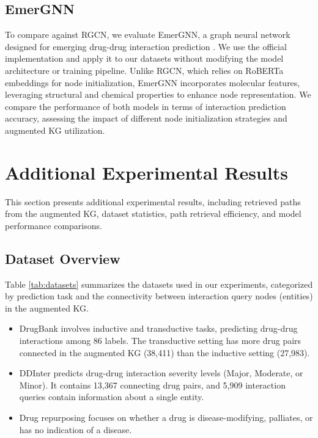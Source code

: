 \subsection{EmerGNN}

To compare against RGCN, we evaluate EmerGNN, a graph neural network designed for emerging drug-drug interaction prediction \cite{zhang2023emergingdruginteractionprediction}. We use the official implementation and apply it to our datasets without modifying the model architecture or training pipeline.  
Unlike RGCN, which relies on RoBERTa embeddings for node initialization, EmerGNN incorporates molecular features, leveraging structural and chemical properties to enhance node representation.
We compare the performance of both models in terms of interaction prediction accuracy, assessing the impact of different node initialization strategies and augmented KG utilization.

\section{Additional Experimental Results}
\label{sec:additional_results}

This section presents additional experimental results, including retrieved paths from the augmented KG, dataset statistics, path retrieval efficiency, and model performance comparisons.

\subsection{Dataset Overview}
Table \ref{tab:datasets} summarizes the datasets used in our experiments, categorized by prediction task and the connectivity between interaction query nodes (entities) in the augmented KG.

\begin{itemize}
    \item DrugBank involves inductive and transductive tasks, predicting drug-drug interactions among 86 labels. The transductive setting has more drug pairs connected in the augmented KG (38,411) than the inductive setting (27,983).
    \item DDInter predicts drug-drug interaction severity levels (Major, Moderate, or Minor). It contains 13,367 connecting drug pairs, and 5,909 interaction queries contain information about a single entity.
    \item Drug repurposing focuses on whether a drug is disease-modifying, palliates, or has no indication of a disease.
\end{itemize}


